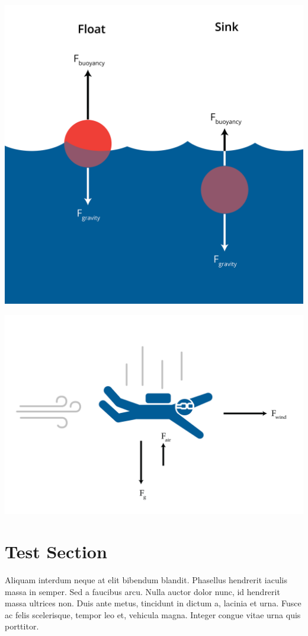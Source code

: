 \includegraphics[width=1\textwidth]{testimage_Buoy.png}

\includegraphics[width=1\textwidth]{testimage_Freefall Option FINAL.png}

\section{Test Section}

Aliquam interdum neque at elit bibendum blandit. Phasellus hendrerit iaculis massa in semper. Sed a faucibus arcu. Nulla auctor dolor nunc, id hendrerit massa ultrices non. Duis ante metus, tincidunt in dictum a, lacinia et urna. Fusce ac felis scelerisque, tempor leo et, vehicula magna. Integer congue vitae urna quis porttitor.


